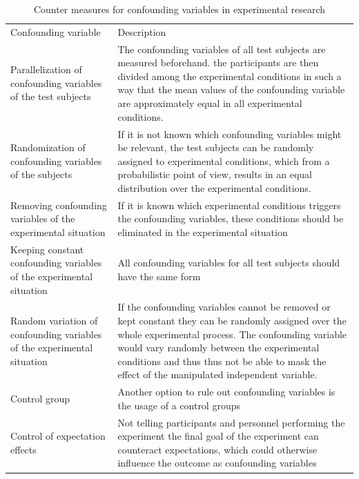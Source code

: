 \begin{table}[htbp]
    \centering
    \begin{tabular}{|L{0.49\textwidth}|L{0.49\textwidth}|}
    Confounding variable                                          & Description \\ 
    Parallelization of confounding variables of the test subjects & The confounding variables of all test subjects are measured beforehand. the participants are then divided among the experimental conditions in such a way that the mean values of the confounding variable are approximately equal in all experimental conditions.         \\ 
    Randomization of confounding variables of the subjects        & If it is not known which confounding variables might be relevant, the test subjects can be randomly assigned to experimental conditions, which from a probabilistic point of view, results in an equal distribution over the experimental conditions.     \\ 
    Removing confounding variables of the experimental situation      & If it is known which experimental conditions triggers the confounding variables, these conditions should be eliminated in the experimental situation            \\ 
    Keeping constant confounding variables of the experimental situation  & All confounding variables for all test subjects should have the same form         \\ 
    Random variation of confounding variables of the experimental situation & If the confounding variables cannot be removed or kept constant they can be randomly assigned over the whole experimental process. The confounding variable would vary randomly between the experimental conditions and thus thus not be able to mask the effect of the manipulated independent variable.     \\ 
    Control group                    &  Another option to rule out confounding variables is the usage of a control groups           \\ 
    Control of expectation effects                   &  Not telling participants and personnel performing the experiment the final goal of the experiment can counteract expectations, which could otherwise influence the outcome as confounding variables           \\ 
    \end{tabular}
    \caption[Counter measures for confounding variables]{Counter measures for confounding variables in experimental research}
    \label{tab:confounding_variables}
    \end{table}

